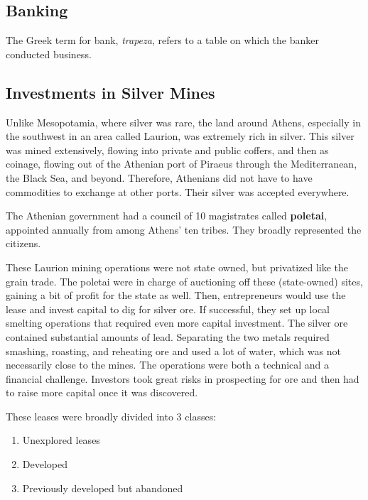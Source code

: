 \documentclass{article}
\begin{document}
  \subsection{Banking}

    The Greek term for bank, \textit{trapeza}, refers to a table on which the banker conducted business. 

  \subsection{Investments in Silver Mines}

    Unlike Mesopotamia, where silver was rare, the land around Athens, especially in the southwest in an area called Laurion, was extremely rich in silver. This silver was mined extensively, flowing into private and public coffers, and then as coinage, flowing out of the Athenian port of Piraeus through the Mediterranean, the Black Sea, and beyond. Therefore, Athenians did not have to have commodities to exchange at other ports. Their silver was accepted everywhere. 


    \begin{politics}[Poletai]
      The Athenian government had a council of 10 magistrates called \textbf{poletai}, appointed annually from among Athens' ten tribes. They broadly represented the citizens. 
    \end{politics}

    These Laurion mining operations were not state owned, but privatized like the grain trade. The poletai were in charge of auctioning off these (state-owned) sites, gaining a bit of profit for the state as well. Then, entrepreneurs would use the lease and invest capital to dig for silver ore. If successful, they set up local smelting operations that required even more capital investment. The silver ore contained substantial amounts of lead. Separating the two metals required smashing, roasting, and reheating ore and used a lot of water, which was not necessarily close to the mines. The operations were both a technical and a financial challenge. Investors took great risks in prospecting for ore and then had to raise more capital once it was discovered. 


    These leases were broadly divided into 3 classes: 
    \begin{enumerate}
      \item Unexplored leases 
      \item Developed 
      \item Previously developed but abandoned
    \end{enumerate}
\end{document}
